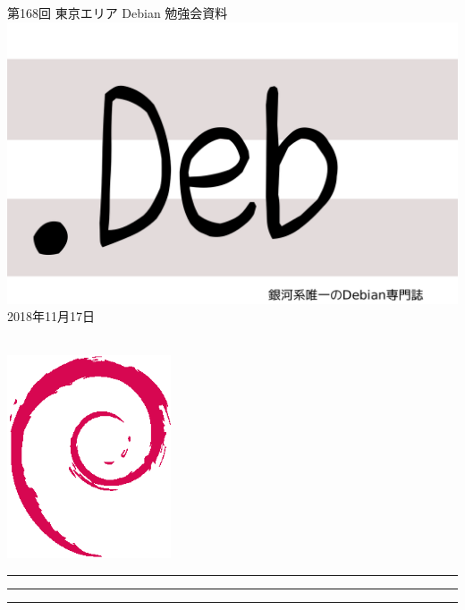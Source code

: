 \documentclass[mingoth,a4paper]{jsarticle}
\newcommand{\debmtgyear}{2018}
\newcommand{\debmtgmonth}{11}
\newcommand{\debmtgdate}{17}
\newcommand{\debmtgnumber}{168}
\begin{document}
\begin{titlepage}
\thispagestyle{empty}

\vspace*{-2cm}
第\debmtgnumber{}回 東京エリア Debian 勉強会資料\\
\hspace*{-2cm}
\includegraphics{image2012-natsu/dotdeb.pdf}\\
\hfill{}\debmtgyear{}年\debmtgmonth{}月\debmtgdate{}日

\\

\vspace*{-2cm}
\hfill{}\includegraphics[height=6cm]{image200502/openlogo-nd.eps}
\end{titlepage}

\newpage

\begin{minipage}[b]{0.2\hsize}
 \colorbox{titleback}{}
\end{minipage}
\begin{minipage}[b]{0.8\hsize}
\hrule
\vspace{2mm}
\hrule
\begin{multicols}{2}
\tableofcontents
\end{multicols}
\vspace{2mm}
\hrule
\end{minipage}
\end{document}
